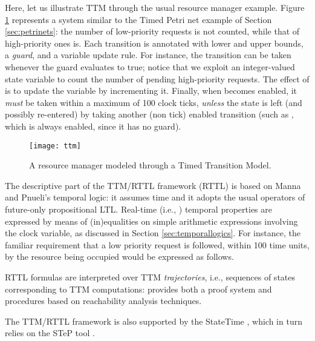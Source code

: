 Here, let us illustrate TTM through the usual resource manager
example. Figure \ref{fig:ttm} represents a system similar to the Timed
Petri net example of Section \ref{sec:petrinets}: the number of
low-priority requests is not counted, while that of high-priority ones
is. Each transition is annotated with lower and upper bounds, a
\emph{guard}, and a variable update rule. For instance, the transition
 can be taken whenever the guard  evaluates to true;
notice that we exploit an integer-valued state variable to count the
number of pending high-priority requests. The effect of  is to
update the  variable by incrementing it. Finally, when 
becomes enabled, it \emph{must} be taken within a maximum of 100 clock
ticks, \emph{unless} the state is left (and possibly re-entered) by
taking another (non tick) enabled transition (such as , which
is always enabled, since it has no guard).
\begin{figure}[htb!]
	 \centering
	 \texttt{[image: ttm]}
	 \caption{A resource manager modeled through a Timed Transition Model.}
	 \label{fig:ttm}
\end{figure}

The descriptive part of the TTM/RTTL framework (RTTL) is based 
on Manna and Pnueli's temporal logic: it assumes  time 
and it adopts the usual operators of future-only propositional 
LTL. Real-time (i.e., ) temporal properties are expressed 
by means of (in)equalities on simple arithmetic expressions involving 
the clock variable, as discussed in Section \ref{sec:temporallogics}. For instance, 
the familiar requirement that a low priority request is followed, 
within 100 time units, by the resource being occupied would be expressed 
as follows.


RTTL formulas are interpreted over TTM \emph{trajectories}, i.e., sequences of states
corresponding to TTM computations: \cite{Ost89} provides both a proof system and  procedures based 
on reachability analysis techniques.

The TTM/RTTL framework is also supported by the StateTime  \cite{Ost97},
which in turn relies on the STeP tool \cite{BBCFMSU00}.


